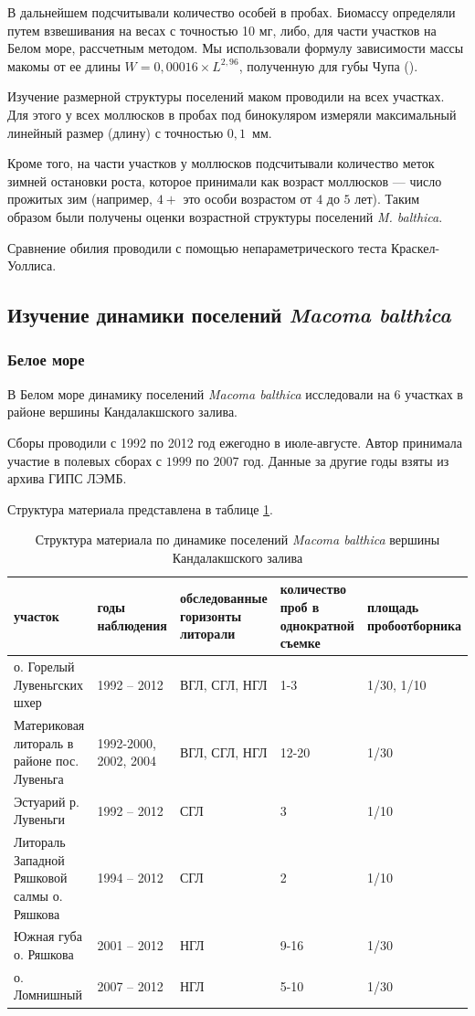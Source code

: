 В дальнейшем подсчитывали количество особей в пробах. 
Биомассу определяли путем взвешивания на весах с точностью 10 мг, либо, для части участков на Белом море, рассчетным методом.
Мы использовали формулу зависимости массы макомы от ее длины $W = 0,00016 \times L^{2,96}$, полученную для губы Чупа (\cite{Maximovich_et_al_1993}).

Изучение размерной структуры поселений маком проводили на всех участках.
Для этого у всех моллюсков в пробах под бинокуляром измеряли максимальный линейный размер (длину) с точностью $0,1$~мм.

Кроме того, на части участков у моллюсков подсчитывали количество меток зимней остановки роста, которое принимали как возраст моллюсков --- число прожитых зим (например, $4+$ это  особи возрастом от $4$ до $5$ лет).   
Таким   образом   были   получены   оценки возрастной структуры поселений {\it M. balthica}.

Сравнение обилия проводили с помощью непараметрического теста Краскел-Уоллиса. 

	\subsection{Изучение динамики поселений {\it Macoma balthica}}
        \subsubsection{Белое море}
В Белом море динамику поселений {\it Macoma balthica} исследовали на $6$ участках в районе вершины Кандалакшского залива. 

Сборы проводили с 1992 по 2012 год ежегодно в июле-августе.
Автор принимала участие в полевых сборах с $1999$ по $2007$ год.
Данные за другие годы взяты из архива ГИПС ЛЭМБ.

Структура материала представлена в таблице \ref{tab:material_Kandalaksha}.
\begin{table}
\caption{Структура материала по динамике поселений {\it Macoma balthica} вершины Кандалакшского залива}
\label{tab:material_Kandalaksha}
    \begin{tabularx}{\textwidth}{|*{5}{X|}} \hline
участок & годы наблюдения & обследованные горизонты литорали & количество проб в однократной съемке & площадь пробоотборника  \\ \hline
о. Горелый Лувеньгских шхер & 1992 -- 2012 & ВГЛ, СГЛ, НГЛ & 1-3 & 1/30, 1/10 \\ \hline
Материковая литораль в районе пос. Лувеньга & 1992-2000, 2002, 2004 & ВГЛ, СГЛ, НГЛ & 12-20 & 1/30 \\ \hline
Эстуарий р. Лувеньги & 1992 -- 2012 & СГЛ & 3 & 1/10 \\ \hline
Литораль Западной Ряшковой салмы о. Ряшкова & 1994 -- 2012 & СГЛ & 2 & 1/10 \\ \hline
Южная губа о. Ряшкова & 2001 -- 2012 & НГЛ & 9-16 & 1/30 \\ \hline
о. Ломнишный & 2007 -- 2012 & НГЛ & 5-10 & 1/30  \\ \hline
\end{tabularx}
\end{table}

